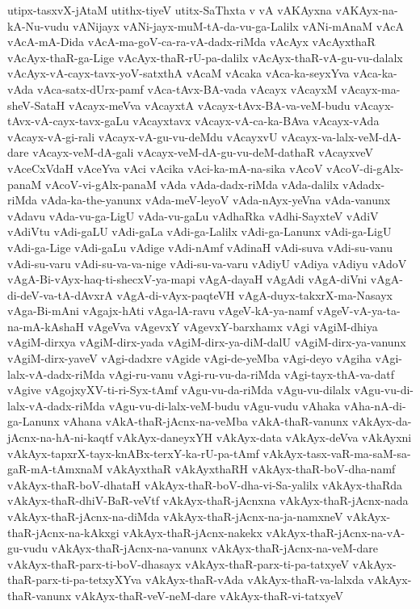 {utipx-tasxvX-jAtaM
utithx-tiyeV
utitx-SaThxta
v
vA
vAKAyxna
vAKAyx-na-kA-Nu-vudu
vANijayx
vANi-jayx-muM-tA-da-vu-ga-Lalilx
vANi-mAnaM
vAcA
vAcA-mA-Dida
vAcA-ma-goV-ca-ra-vA-dadx-riMda
vAcAyx
vAcAyxthaR
vAcAyx-thaR-ga-Lige
vAcAyx-thaR-rU-pa-dalilx
vAcAyx-thaR-vA-gu-vu-dalalx
vAcAyx-vA-cayx-tavx-yoV-satxthA
vAcaM
vAcaka
vAca-ka-seyxYva
vAca-ka-vAda
vAca-satx-dUrx-pamf
vAca-tAvx-BA-vada
vAcayx
vAcayxM
vAcayx-ma-sheV-SataH
vAcayx-meVva
vAcayxtA
vAcayx-tAvx-BA-va-veM-budu
vAcayx-tAvx-vA-cayx-tavx-gaLu
vAcayxtavx
vAcayx-vA-ca-ka-BAva
vAcayx-vAda
vAcayx-vA-gi-rali
vAcayx-vA-gu-vu-deMdu
vAcayxvU
vAcayx-va-lalx-veM-dA-dare
vAcayx-veM-dA-gali
vAcayx-veM-dA-gu-vu-deM-dathaR
vAcayxveV
vAceCxVdaH
vAceYva
vAci
vAcika
vAci-ka-mA-na-sika
vAcoV
vAcoV-di-gAlx-panaM
vAcoV-vi-gAlx-panaM
vAda
vAda-dadx-riMda
vAda-dalilx
vAdadx-riMda
vAda-ka-the-yanunx
vAda-meV-leyoV
vAda-nAyx-yeVna
vAda-vanunx
vAdavu
vAda-vu-ga-LigU
vAda-vu-gaLu
vAdhaRka
vAdhi-SayxteV
vAdiV
vAdiVtu
vAdi-gaLU
vAdi-gaLa
vAdi-ga-Lalilx
vAdi-ga-Lanunx
vAdi-ga-LigU
vAdi-ga-Lige
vAdi-gaLu
vAdige
vAdi-nAmf
vAdinaH
vAdi-suva
vAdi-su-vanu
vAdi-su-varu
vAdi-su-va-va-nige
vAdi-su-va-varu
vAdiyU
vAdiya
vAdiyu
vAdoV
vAgA-Bi-vAyx-haq-ti-shecxV-ya-mapi
vAgA-dayaH
vAgAdi
vAgA-diVni
vAgA-di-deV-va-tA-dAvxrA
vAgA-di-vAyx-paqteVH
vAgA-duyx-takxrX-ma-Nasayx
vAga-Bi-mAni
vAgajx-hAti
vAga-lA-ravu
vAgeV-kA-ya-namf
vAgeV-vA-ya-ta-na-mA-kAshaH
vAgeVva
vAgevxY
vAgevxY-barxhamx
vAgi
vAgiM-dhiya
vAgiM-dirxya
vAgiM-dirx-yada
vAgiM-dirx-ya-diM-dalU
vAgiM-dirx-ya-vanunx
vAgiM-dirx-yaveV
vAgi-dadxre
vAgide
vAgi-de-yeMba
vAgi-deyo
vAgiha
vAgi-lalx-vA-dadx-riMda
vAgi-ru-vanu
vAgi-ru-vu-da-riMda
vAgi-tayx-thA-va-datf
vAgive
vAgojxyXV-ti-ri-Syx-tAmf
vAgu-vu-da-riMda
vAgu-vu-dilalx
vAgu-vu-di-lalx-vA-dadx-riMda
vAgu-vu-di-lalx-veM-budu
vAgu-vudu
vAhaka
vAha-nA-di-ga-Lanunx
vAhana
vAkA-thaR-jAcnx-na-veMba
vAkA-thaR-vanunx
vAkAyx-da-jAcnx-na-hA-ni-kaqtf
vAkAyx-daneyxYH
vAkAyx-data
vAkAyx-deVva
vAkAyxni
vAkAyx-tapxrX-tayx-knABx-terxY-ka-rU-pa-tAmf
vAkAyx-tasx-vaR-ma-saM-sa-gaR-mA-tAmxnaM
vAkAyxthaR
vAkAyxthaRH
vAkAyx-thaR-boV-dha-namf
vAkAyx-thaR-boV-dhataH
vAkAyx-thaR-boV-dha-vi-Sa-yalilx
vAkAyx-thaRda
vAkAyx-thaR-dhiV-BaR-veVtf
vAkAyx-thaR-jAcnxna
vAkAyx-thaR-jAcnx-nada
vAkAyx-thaR-jAcnx-na-diMda
vAkAyx-thaR-jAcnx-na-ja-namxneV
vAkAyx-thaR-jAcnx-na-kAkxgi
vAkAyx-thaR-jAcnx-nakekx
vAkAyx-thaR-jAcnx-na-vA-gu-vudu
vAkAyx-thaR-jAcnx-na-vanunx
vAkAyx-thaR-jAcnx-na-veM-dare
vAkAyx-thaR-parx-ti-boV-dhasayx
vAkAyx-thaR-parx-ti-pa-tatxyeV
vAkAyx-thaR-parx-ti-pa-tetxyXYva
vAkAyx-thaR-vAda
vAkAyx-thaR-va-lalxda
vAkAyx-thaR-vanunx
vAkAyx-thaR-veV-neM-dare
vAkAyx-thaR-vi-tatxyeV
}
